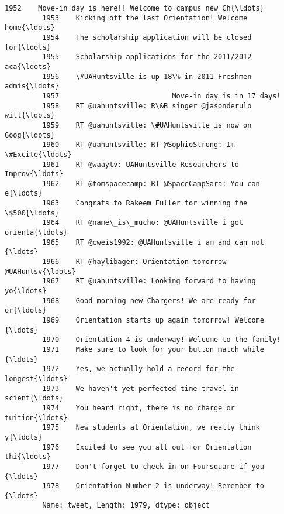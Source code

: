\documentclass[11pt]{article}
\begin{document}
\begin{Verbatim}[commandchars=\\\{\}]
         1952    Move-in day is here!! Welcome to campus new Ch{\ldots}
         1953    Kicking off the last Orientation! Welcome home{\ldots}
         1954    The scholarship application will be closed for{\ldots}
         1955    Scholarship applications for the 2011/2012 aca{\ldots}
         1956    \#UAHuntsville is up 18\% in 2011 Freshmen admis{\ldots}
         1957                           Move-in day is in 17 days!
         1958    RT @uahuntsville: R\&B singer @jasonderulo will{\ldots}
         1959    RT @uahuntsville: \#UAHuntsville is now on Goog{\ldots}
         1960    RT @uahuntsville: RT @SophieStrong: Im \#Excite{\ldots}
         1961    RT @waaytv: UAHuntsville Researchers to Improv{\ldots}
         1962    RT @tomspacecamp: RT @SpaceCampSara: You can e{\ldots}
         1963    Congrats to Rakeem Fuller for winning the \$500{\ldots}
         1964    RT @name\_is\_mucho: @UAHuntsville i got orienta{\ldots}
         1965    RT @cweis1992: @UAHuntsville i am and can not {\ldots}
         1966    RT @haylibager: Orientation tomorrow @UAHuntsv{\ldots}
         1967    RT @uahuntsville: Looking forward to having yo{\ldots}
         1968    Good morning new Chargers! We are ready for or{\ldots}
         1969    Orientation starts up again tomorrow! Welcome {\ldots}
         1970    Orientation 4 is underway! Welcome to the family!
         1971    Make sure to look for your button match while {\ldots}
         1972    Yes, we actually hold a record for the longest{\ldots}
         1973    We haven't yet perfected time travel in scient{\ldots}
         1974    You heard right, there is no charge or tuition{\ldots}
         1975    New students at Orientation, we really think y{\ldots}
         1976    Excited to see you all out for Orientation thi{\ldots}
         1977    Don't forget to check in on Foursquare if you {\ldots}
         1978    Orientation Number 2 is underway! Remember to {\ldots}
         Name: tweet, Length: 1979, dtype: object
\end{Verbatim}
            
\end{document}
